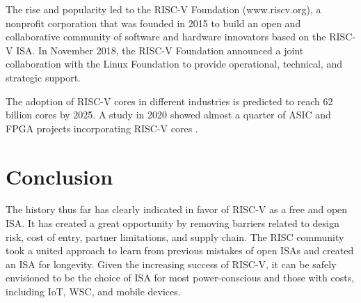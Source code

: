 \documentclass[journal]{IEEEtran}
\begin{document}
The rise and popularity led to the RISC-V Foundation (www.riscv.org), a nonprofit corporation that was founded in 2015 to build an open and collaborative community of software and hardware innovators based on the RISC-V ISA. In November 2018, the RISC-V Foundation announced a joint collaboration with the Linux Foundation to provide operational, technical, and strategic support.

The adoption of RISC-V cores in different industries is predicted to reach 62 billion cores by 2025. A study in 2020 showed almost a quarter of ASIC and FPGA projects incorporating RISC-V cores \cite{redmond_risc-v_2021}.

\section{Conclusion}
The history thus far has clearly indicated in favor of RISC-V as a free and open ISA. It has created a great opportunity by removing barriers related to design risk, cost of entry, partner limitations, and supply chain. The RISC community took a united approach to learn from previous mistakes of open ISAs and created an ISA for longevity. Given the increasing success of RISC-V, it can be safely envisioned to be the choice of ISA for most power-conscious and those with costs, including IoT, WSC, and mobile devices.  









\end{document}
